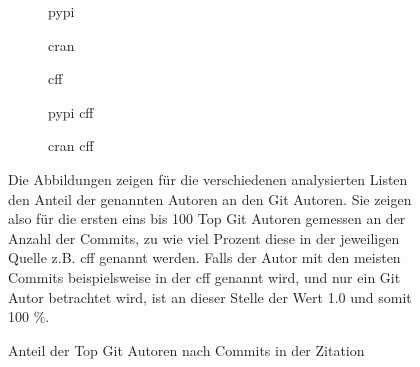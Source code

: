 \begin{figure}
    \begin{subfigure}{.5\textwidth}
        \centering
        
        \caption{\gls{pypi}}
        \label{fig:common_authors_pypi}
    \end{subfigure}%
    \begin{subfigure}{.5\textwidth}
        \centering
        
        \caption{\gls{cran}}
        \label{fig:common_authors_cran}
    \end{subfigure}
    \begin{subfigure}{.5\textwidth}
        \centering
        
        \caption{\gls{cff}}
        \label{fig:common_authors_cff}
    \end{subfigure}%
    \begin{subfigure}{.5\textwidth}
        \centering
        
        \caption{\gls{pypi} \gls{cff}}
        \label{fig:common_authors_pypi_cff}
    \end{subfigure}
    \centering
    \begin{subfigure}{.5\textwidth}
        \centering
        
        \caption{\gls{cran} \gls{cff}}
        \label{fig:common_authors_cran_cff}
    \end{subfigure}
    \caption{Anteil der Top Git Autoren nach Commits in der Zitation}
    \label{fig:common_authors}
    \small
    Die Abbildungen zeigen für die verschiedenen analysierten Listen den Anteil der genannten Autoren an den Git Autoren. Sie zeigen also für die ersten eins bis 100 Top Git Autoren gemessen an der Anzahl der Commits, zu wie viel Prozent diese in der jeweiligen Quelle z.B. \gls{cff} genannt werden. Falls der Autor mit den meisten Commits beispielsweise in der \gls{cff} genannt wird, und nur ein Git Autor betrachtet wird, ist an dieser Stelle der Wert 1.0 und somit 100 \%.
\end{figure}

